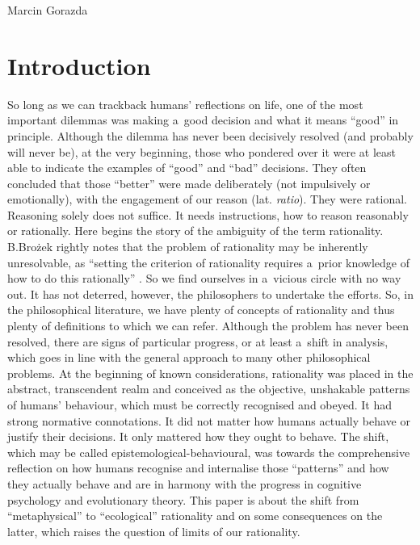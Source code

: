 \begin{artengenv}{Marcin Gorazda}
\section*{Introduction}
\lettrine[loversize=0.13,lines=2,lraise=-0.01,nindent=0em,findent=0.2pt]%
{S}{}o long as we can trackback humans' reflections on life, one of the most important dilemmas was making a~good decision and what it means ``good'' in principle. Although the dilemma has never been decisively resolved (and probably will never be), at the very beginning, those who pondered over it were at least able to indicate the examples of ``good'' and ``bad'' decisions. They often concluded that those ``better'' were made deliberately (not impulsively or emotionally), with the engagement of our reason (lat. \textit{ratio}). They were rational. Reasoning solely does not suffice. It needs instructions, how to reason reasonably or rationally. Here begins the story of the ambiguity of the term rationality. B.Brożek rightly notes that the problem of rationality may be inherently unresolvable, as ``setting the criterion of rationality requires a~prior knowledge of how to do this rationally''
\parencite[][p.158]{brozek_rationality_2007}. %
 So we find ourselves in a~vicious circle with no way out. It has not deterred, however, the philosophers to undertake the efforts. So, in the philosophical literature, we have plenty of concepts of rationality and thus plenty of definitions to which we can refer. Although the problem has never been resolved, there are signs of particular progress, or at least a~shift in analysis, which goes in line with the general approach to many other philosophical problems. At the beginning of known considerations, rationality was placed in the abstract, transcendent realm and conceived as the objective, unshakable patterns of humans' behaviour, which must be correctly recognised and obeyed. It had strong normative connotations. It did not matter how humans actually behave or justify their decisions. It only mattered how they ought to behave. The shift, which may be called epistemological-behavioural, was towards the comprehensive reflection on how humans recognise and internalise those ``patterns'' and how they actually behave and are in harmony with the progress in cognitive psychology and evolutionary theory. This paper is about the shift from ``metaphysical'' to ``ecological'' rationality and on some consequences on the latter, which raises the question of limits of our rationality.


\end{artengenv}
